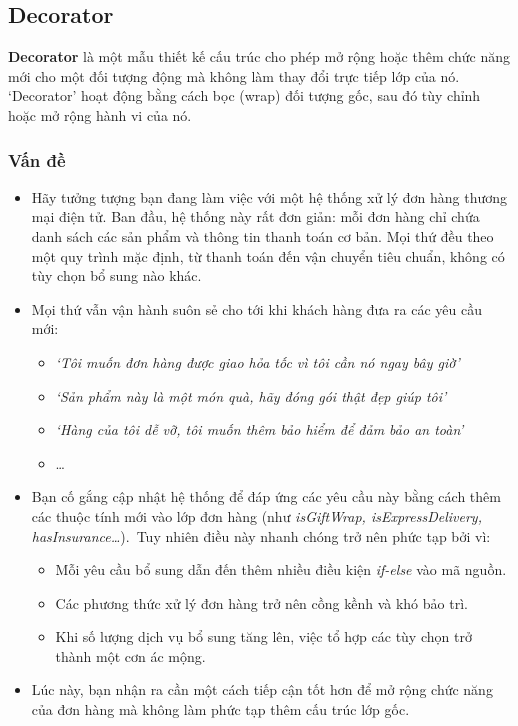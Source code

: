 \subsection{Decorator}
\begin{flushleft}
    \textbf{Decorator} là một mẫu thiết kế cấu trúc cho phép mở rộng hoặc thêm chức năng mới cho một đối tượng động mà không làm thay đổi trực tiếp lớp của nó. `Decorator' hoạt động bằng cách bọc (wrap) đối tượng gốc, sau đó tùy chỉnh hoặc mở rộng hành vi của nó.
\end{flushleft}

\subsubsection{Vấn đề}
\begin{itemize}
    \item Hãy tưởng tượng bạn đang làm việc với một hệ thống xử lý đơn hàng thương mại điện tử. Ban đầu, hệ thống này rất đơn giản: mỗi đơn hàng chỉ chứa danh sách các sản phẩm và thông tin thanh toán cơ bản. Mọi thứ đều theo một quy trình mặc định, từ thanh toán đến vận chuyển tiêu chuẩn, không có tùy chọn bổ sung nào khác.
    \item Mọi thứ vẫn vận hành suôn sẻ cho tới khi khách hàng đưa ra các yêu cầu mới:
          \begin{itemize}
              \item \textit{`Tôi muốn đơn hàng được giao hỏa tốc vì tôi cần nó ngay bây giờ'}
              \item \textit{`Sản phẩm này là một món quà, hãy đóng gói thật đẹp giúp tôi'}
              \item \textit{`Hàng của tôi dễ vỡ, tôi muốn thêm bảo hiểm để đảm bảo an toàn'}
              \item \ldots
          \end{itemize}
    \item Bạn cố gắng cập nhật hệ thống để đáp ứng các yêu cầu này bằng cách thêm các thuộc tính mới vào lớp đơn hàng (như \textit{isGiftWrap, isExpressDelivery, hasInsurance\ldots}).\newline~Tuy nhiên điều này nhanh chóng trở nên phức tạp bởi vì:
          \begin{itemize}
              \item Mỗi yêu cầu bổ sung dẫn đến thêm nhiều điều kiện \textit{if-else} vào mã nguồn.
              \item Các phương thức xử lý đơn hàng trở nên cồng kềnh và khó bảo trì.
              \item Khi số lượng dịch vụ bổ sung tăng lên, việc tổ hợp các tùy chọn trở thành một cơn ác mộng.
          \end{itemize}
    \item Lúc này, bạn nhận ra cần một cách tiếp cận tốt hơn để mở rộng chức năng của đơn hàng mà không làm phức tạp thêm cấu trúc lớp gốc.
\end{itemize}

